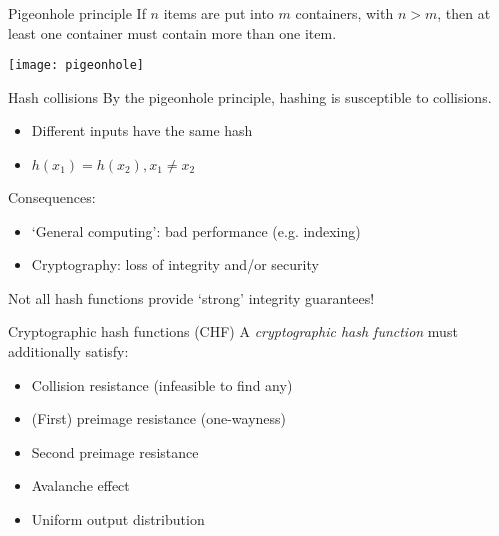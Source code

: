 \begin{frame}{Pigeonhole principle}
  \pause
  If $n$ items are put into $m$ containers, with $n > m$, then at least one container must contain more than one item.

  \vspace*{1em}

  \pause
  \begin{center}
    \texttt{[image: pigeonhole]}
  \end{center}
\end{frame}

\begin{frame}{Hash collisions}
  By the pigeonhole principle, hashing is susceptible to collisions.
  \begin{itemize}[<+(1)->]
    \item Different inputs have the same hash
    \item $h(x_1) = h(x_2), x_1 \neq x_2$
  \end{itemize}

  \vspace*{1em}

  \pause
  Consequences:
  \begin{itemize}[<+(1)->]
    \item `General computing': bad performance (e.g. indexing)
    \item Cryptography: loss of integrity and/or security
  \end{itemize}

  \vspace*{1em}

  \pause
  Not all hash functions provide `strong' integrity guarantees!
\end{frame}

\begin{frame}{Cryptographic hash functions (CHF)}
  A \emph{cryptographic hash function} must additionally satisfy:
  \begin{itemize}[<+(1)->]
    \item Collision resistance (infeasible to find any)
    \item (First) preimage resistance (one-wayness)
    \item Second preimage resistance
    \item Avalanche effect
    \item Uniform output distribution
  \end{itemize}
\end{frame}

